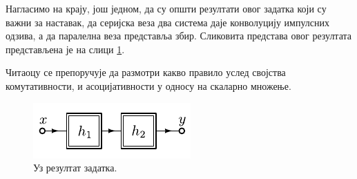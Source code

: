 Нагласимо на крају, још једном, да су општи резултати овог задатка који су важни за наставак, да серијска веза два система даје конволуцију 
импулсних одзива, а да паралелна веза представља збир. Сликовита представа овог резултата представљена је на слици \ref{fig:\ID.1}.

Читаоцу се препоручује да размотри какво правило услед својства комутативности, и асоцијативности у односу на скаларно множење. 

\begin{figure}[ht!]
    \centering
    \includegraphics[page=3]{fig/ser_par.pdf}
    \caption{Уз резултат задатка. }
    \label{fig:\ID.1}
\end{figure}